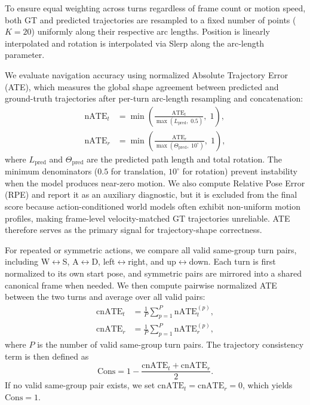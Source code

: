 To ensure equal weighting across turns regardless of frame count or motion speed, both GT and predicted trajectories are resampled to a fixed number of points ($K = 20$) uniformly along their respective arc lengths.
Position is linearly interpolated and rotation is interpolated via Slerp along the arc-length parameter.

We evaluate navigation accuracy using normalized Absolute Trajectory Error (ATE), which measures the global shape agreement between predicted and ground-truth trajectories after per-turn arc-length resampling and concatenation:
\begin{align}
  \mathrm{nATE}_t &= \min\!\left(\frac{\mathrm{ATE}_t}{\max(L_{\mathrm{pred}},\; 0.5)},\; 1\right), \label{eq:nate_t} \\
  \mathrm{nATE}_r &= \min\!\left(\frac{\mathrm{ATE}_r}{\max(\Theta_{\mathrm{pred}},\; 10^\circ)},\; 1\right),
\end{align}
where $L_{\mathrm{pred}}$ and $\Theta_{\mathrm{pred}}$ are the predicted path length and total rotation.
The minimum denominators ($0.5$ for translation, $10^\circ$ for rotation) prevent instability when the model produces near-zero motion.
We also compute Relative Pose Error (RPE) and report it as an auxiliary diagnostic, but it is excluded from the final score because action-conditioned world models often exhibit non-uniform motion profiles, making frame-level velocity-matched GT trajectories unreliable.
ATE therefore serves as the primary signal for trajectory-shape correctness.

For repeated or symmetric actions, we compare all valid same-group turn pairs, including W$\leftrightarrow$S, A$\leftrightarrow$D, left$\leftrightarrow$right, and up$\leftrightarrow$down.
Each turn is first normalized to its own start pose, and symmetric pairs are mirrored into a shared canonical frame when needed.
We then compute pairwise normalized ATE between the two turns and average over all valid pairs:
\begin{align}
  \mathrm{cnATE}_t &= \frac{1}{P}\sum_{p=1}^{P} \mathrm{nATE}^{(p)}_t, \\
  \mathrm{cnATE}_r &= \frac{1}{P}\sum_{p=1}^{P} \mathrm{nATE}^{(p)}_r,
\end{align}
where $P$ is the number of valid same-group turn pairs.
The trajectory consistency term is then defined as
\begin{equation}
  \mathrm{Cons} = 1 - \frac{\mathrm{cnATE}_t + \mathrm{cnATE}_r}{2}.
\end{equation}
If no valid same-group pair exists, we set $\mathrm{cnATE}_t = \mathrm{cnATE}_r = 0$, which yields $\mathrm{Cons} = 1$.

